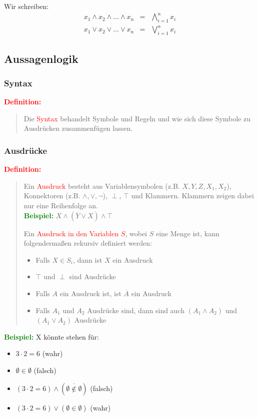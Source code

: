 \documentclass{article}
\newcommand{\red}[1]{\textcolor{red}{#1}}
\newcommand{\green}[1]{\textcolor{green}{#1}}
\newcommand{\ex}{\green{\textbf{Beispiel: }}}
\newcommand{\de}[1]{\red{\textbf{Definition: }}\begin{quote}#1\end{quote}}
\newcommand{\n}[1]{\overline{#1}}
\begin{document}
Wir schreiben:
\begin{equation*}
    \begin{array}{lcl}
        x_1 \land x_2 \land \dots \land x_n & = & \bigwedge_{i = 1}^n x_i\\
        x_1 \lor x_2 \lor \dots \lor x_n & = & \bigvee_{i = 1}^n x_i
    \end{array}
\end{equation*}

\newpage
\subsection{Aussagenlogik}

\subsubsection{Syntax}

\de{Die \red{Syntax} behandelt Symbole und Regeln und wie sich diese Symbole zu Ausdrücken zusammenfügen lassen.}

\subsubsection{Ausdrücke}

\de{Ein \red{Ausdruck} besteht aus Variablensymbolen (z.B. $X,Y,Z,X_1,X_2$), Konnektoren (z.B. $\land, \lor, \neg$), $\perp$, $\top$ und Klammern. Klammern zeigen dabei nur eine Reihenfolge an.\\
\ex $X \land (\n{Y} \lor X) \land \top$

Ein \red{Ausdruck in den Variablen $S$}, wobei $S$ eine Menge ist, kann folgendermaßen rekursiv definiert werden:
\begin{itemize}
    \item Falls $X \in S_i$, dann ist $X$ ein Ausdruck
    \item $\top$ und $\perp$ sind Ausdrücke
    \item Falls $A$ ein Ausdruck ist, ist $\n{A}$ ein Ausdruck
    \item Falls $A_1$ und $A_2$ Ausdrücke sind, dann sind auch $(A_1 \land A_2)$ und $(A_1 \lor A_2)$ Ausdrücke
\end{itemize}
}

\ex X könnte stehen für:
\begin{itemize}
    \item $3 \cdot 2 = 6$ (wahr)
    \item $\emptyset \in \emptyset$ (falsch)
    \item $(3 \cdot 2 = 6) \land (\n{\emptyset \notin \emptyset})$ (falsch)
    \item $(3 \cdot 2 = 6) \lor (\emptyset \in \emptyset)$ (wahr)
\end{itemize}
\end{document}
